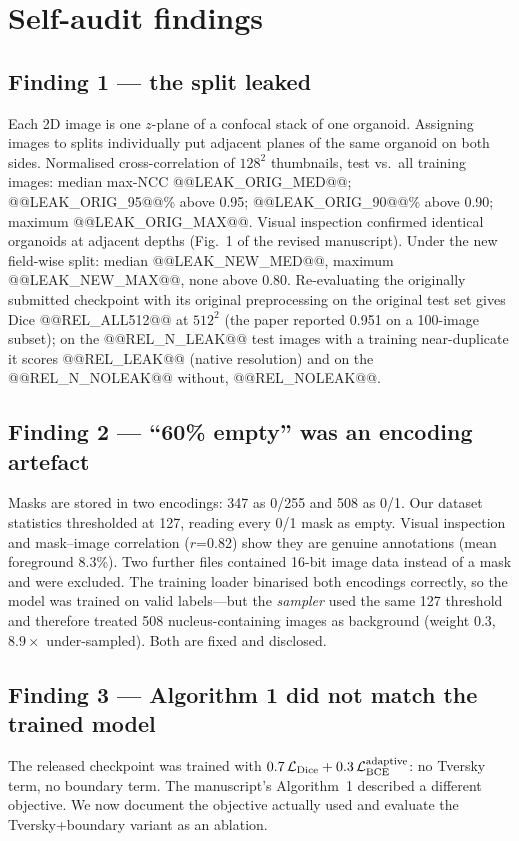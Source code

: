\documentclass[11pt]{article}
\begin{document}
\section{Self-audit findings}\label{sec:audit}
\subsection*{Finding 1 --- the split leaked}
Each 2D image is one $z$-plane of a confocal stack of one organoid. Assigning images to splits individually put adjacent planes of the same organoid on both sides. Normalised cross-correlation of $128^2$ thumbnails, test vs.\ all training images: median max-NCC @@LEAK_ORIG_MED@@; @@LEAK_ORIG_95@@\% above 0.95; @@LEAK_ORIG_90@@\% above 0.90; maximum @@LEAK_ORIG_MAX@@. Visual inspection confirmed identical organoids at adjacent depths (Fig.~1 of the revised manuscript). Under the new field-wise split: median @@LEAK_NEW_MED@@, maximum @@LEAK_NEW_MAX@@, none above 0.80. Re-evaluating the originally submitted checkpoint with its original preprocessing on the original test set gives Dice @@REL_ALL512@@ at $512^2$ (the paper reported 0.951 on a 100-image subset); on the @@REL_N_LEAK@@ test images with a training near-duplicate it scores @@REL_LEAK@@ (native resolution) and on the @@REL_N_NOLEAK@@ without, @@REL_NOLEAK@@.

\subsection*{Finding 2 --- ``60\% empty'' was an encoding artefact}
Masks are stored in two encodings: 347 as 0/255 and 508 as 0/1. Our dataset statistics thresholded at 127, reading every 0/1 mask as empty. Visual inspection and mask--image correlation ($r$=0.82) show they are genuine annotations (mean foreground 8.3\%). Two further files contained 16-bit image data instead of a mask and were excluded. The training loader binarised both encodings correctly, so the model was trained on valid labels---but the \emph{sampler} used the same 127 threshold and therefore treated 508 nucleus-containing images as background (weight 0.3, $8.9\times$ under-sampled). Both are fixed and disclosed.

\subsection*{Finding 3 --- Algorithm 1 did not match the trained model}
The released checkpoint was trained with $0.7\,\mathcal{L}_{\rm Dice}+0.3\,\mathcal{L}_{\rm BCE}^{\rm adaptive}$: no Tversky term, no boundary term. The manuscript's Algorithm~1 described a different objective. We now document the objective actually used and evaluate the Tversky+boundary variant as an ablation.
\end{document}
